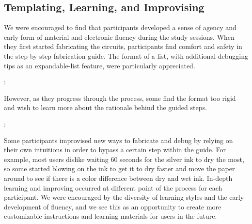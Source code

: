 \documentclass{sigchi}
\begin{document}
\subsection{Templating, Learning, and Improvising}
We were encouraged to find that participants developed a sense of agency and early form of material and electronic fluency during the study sessions. When they first started fabricating the circuits, participants find comfort and safety in the step-by-step fabrication guide. The format of a list, with additional debugging tips as an expandable-list feature, were particularly appreciated. 
  \begin{myquote}
  \vspace{-2pt}
    :
    \vspace{-2pt}
  \end{myquote}
However, as they progress through the process, some find the format too rigid and wish to learn more about the rationale behind the guided steps. 

  \begin{myquote}
  \vspace{-2pt}
    :
    \vspace{-2pt}
  \end{myquote}
  
  Some participants improvised new ways to fabricate and debug by relying on their own intuitions in order to bypass a certain step within the guide. For example, most users dislike waiting 60 seconds for the silver ink to dry the most, so some started blowing on the ink to get it to dry faster and move the paper around to see if there is a color difference between dry and wet ink. In-depth learning and improving occurred at different point of the process for each participant. We were encouraged by the diversity of learning styles and the early development of fluency, and we see this as an opportunity to create more customizable instructions and learning materials for users in the future. 
\end{document}
